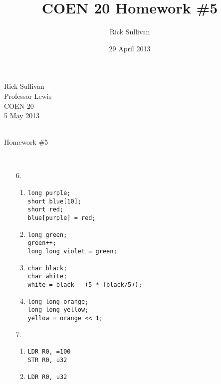 \documentclass{article}
\title{COEN 20 Homework \#5}
\date{29 April 2013}
\author{Rick Sullivan}
\begin{document}
\noindent Rick Sullivan     \\
          Professor Lewis   \\
          COEN 20           \\
          5 May 2013        \\
                            \\
\centerline {Homework \#5}    \\

\begin{enumerate}
    \item[6.]
        \begin{enumerate}
            \item
                \texttt{long purple;} \\
                \texttt{short blue[10];} \\
                \texttt{short red;} \\
                \texttt{blue[purple] = red;} \\
            \item
                \texttt{long green;}   \\
                \texttt{green++;}   \\
                \texttt{long long violet = green;}   \\
            \item
                \texttt{char black;}   \\
                \texttt{char white;}   \\
                \texttt{white = black - (5 * (black/5));}   \\
            \item
                \texttt{long long orange;}  \\
                \texttt{long long yellow;}  \\
                \texttt{yellow = orange << 1;}  \\
        \end{enumerate}
    \item[7.]
        \begin{multicols}{2}
        \begin{enumerate}
            \item
                \texttt{LDR R0, =100}   \\
                \texttt{STR R0, u32}    \\
            \item
                \texttt{LDR R0, u32}    \\

\end{enumerate}
\end{multicols}
\end{enumerate}
\end{document}
